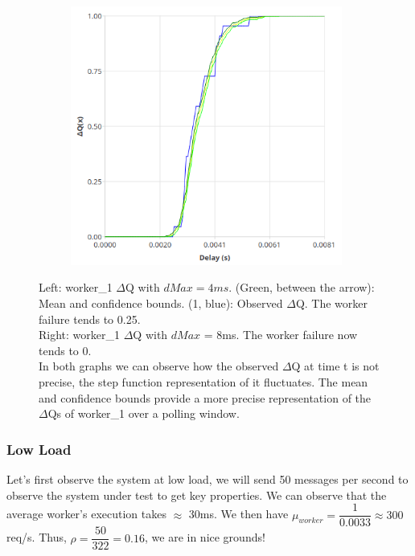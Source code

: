 \begin{figure}[H]
\begin{subfigure}{.5\textwidth}
                \includegraphics[width =0.98\textwidth]{img/overload_2/worker_1_8.png}
                \label{fig:w18}
            \end{subfigure}
            \label{fig:w1w2hb}
            \caption{Left: worker\_1 $\Delta$Q with $dMax = 4ms$. (Green, between the arrow): Mean and confidence bounds. (1, blue): Observed $\Delta$Q. The worker failure tends to 0.25. \\
            Right: worker\_1 $\Delta$Q with $dMax$ = 8ms. The worker failure now tends to 0. \\
            In both graphs we can observe how the observed $\Delta$Q at time t is not precise, the step function representation of it fluctuates. The mean and confidence bounds provide a more precise representation of the $\Delta$Qs of worker\_1 over a polling window.}%
            \end{figure}
    \subsubsection{Low Load} 
    Let's first observe the system at low load, we will send 50 messages per second to observe the system under test to get key properties.
    We can observe that the average worker's execution takes $\approx$ 30ms. We then have $\mu_{worker} = \dfrac{1}{0.0033} \approx 300$ req/s. Thus, $\rho = \dfrac{50}{322} = 0.16$, we are in nice grounds!

